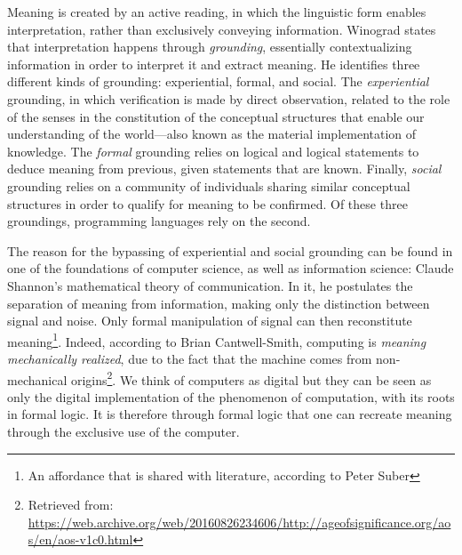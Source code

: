 Meaning is created by an active reading, in which the linguistic form enables interpretation, rather than exclusively conveying information. Winograd states that interpretation happens through \emph{grounding}, essentially contextualizing information in order to interpret it and extract meaning. He identifies three different kinds of grounding: experiential, formal, and social. The \emph{experiential} grounding, in which verification is made by direct observation, related to the role of the senses in the constitution of the conceptual structures that enable our understanding of the world—also known as the material implementation of knowledge. The \emph{formal} grounding relies on logical and logical statements to deduce meaning from previous, given statements that are known. Finally, \emph{social} grounding relies on a community of individuals sharing similar conceptual structures in order to qualify for meaning to be confirmed. Of these three groundings, programming languages rely on the second.

The reason for the bypassing of experiential and social grounding can be found in one of the foundations of computer science, as well as information science: Claude Shannon's mathematical theory of communication. In it, he postulates the separation of meaning from information, making only the distinction between signal and noise. Only formal manipulation of signal can then reconstitute meaning\footnote{An affordance that is shared with literature, according to Peter Suber\citep{suber_what_1988}}. Indeed, according to Brian Cantwell-Smith, computing is \emph{meaning mechanically realized}, due to the fact that the machine comes from non-mechanical origins\footnote{Retrieved from: \url{https://web.archive.org/web/20160826234606/http://ageofsignificance.org/aos/en/aos-v1c0.html}}. We think of computers as digital but they can be seen as only the digital implementation of the phenomenon of computation, with its roots in formal logic. It is therefore through formal logic that one can recreate meaning through the exclusive use of the computer.

